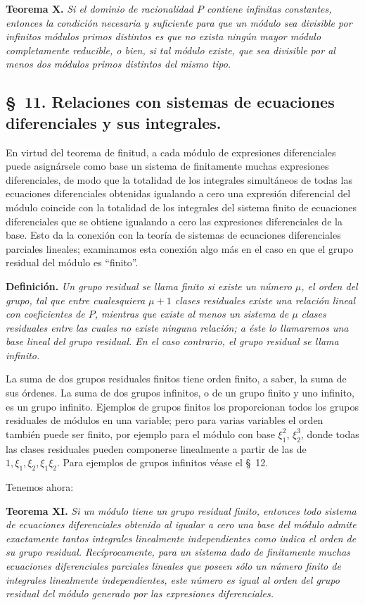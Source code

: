 \documentclass[11pt]{article}
\begin{document}
\textbf{Teorema X.} \emph{Si el dominio de racionalidad $P$ contiene infinitas constantes, entonces la condición necesaria y suficiente para que un módulo sea divisible por infinitos módulos primos distintos es que no exista ningún mayor módulo completamente reducible, o bien, si tal módulo existe, que sea divisible por al menos dos módulos primos distintos del mismo tipo.}

\subsection*{\S~11. Relaciones con sistemas de ecuaciones diferenciales y sus integrales.}

En virtud del teorema de finitud, a cada módulo de expresiones diferenciales puede asignársele como base un sistema de finitamente muchas expresiones diferenciales, de modo que la totalidad de los integrales simultáneos de todas las ecuaciones diferenciales obtenidas igualando a cero una expresión diferencial del módulo coincide con la totalidad de los integrales del sistema finito de ecuaciones diferenciales que se obtiene igualando a cero las expresiones diferenciales de la base. Esto da la conexión con la teoría de sistemas de ecuaciones diferenciales parciales lineales; examinamos esta conexión algo más en el caso en que el grupo residual del módulo es ``finito''.

\textbf{Definición.} \emph{Un grupo residual se llama finito si existe un número $\mu$, el orden del grupo, tal que entre cualesquiera $\mu+1$ clases residuales existe una relación lineal con coeficientes de $P$, mientras que existe al menos un sistema de $\mu$ clases residuales entre las cuales no existe ninguna relación; a éste lo llamaremos una base lineal del grupo residual. En el caso contrario, el grupo residual se llama infinito.}

La suma de dos grupos residuales finitos tiene orden finito, a saber, la suma de sus órdenes. La suma de dos grupos infinitos, o de un grupo finito y uno infinito, es un grupo infinito. Ejemplos de grupos finitos los proporcionan todos los grupos residuales de módulos en una variable; pero para varias variables el orden también puede ser finito, por ejemplo para el módulo con base $\xi_1^2$, $\xi_2^3$, donde todas las clases residuales pueden componerse linealmente a partir de las de $1,\xi_1,\xi_2,\xi_1\xi_2$. Para ejemplos de grupos infinitos véase el \S~12.

Tenemos ahora:

\textbf{Teorema XI.} \emph{Si un módulo tiene un grupo residual finito, entonces todo sistema de ecuaciones diferenciales obtenido al igualar a cero una base del módulo admite exactamente tantos integrales linealmente independientes como indica el orden de su grupo residual. Recíprocamente, para un sistema dado de finitamente muchas ecuaciones diferenciales parciales lineales que poseen sólo un número finito de integrales linealmente independientes, este número es igual al orden del grupo residual del módulo generado por las expresiones diferenciales.}
\end{document}

